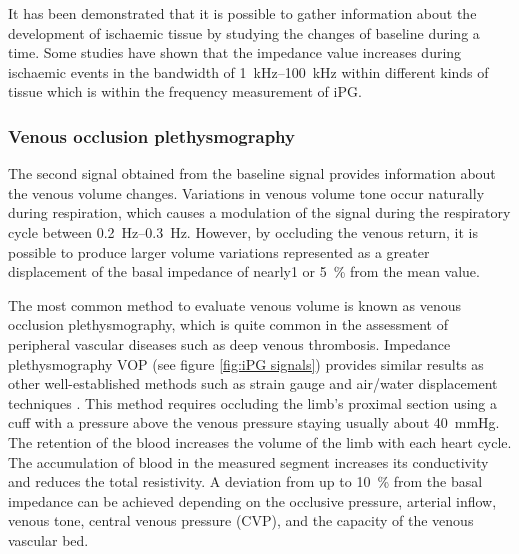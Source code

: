 It has been demonstrated that it is possible to gather information about the development of ischaemic tissue by studying the changes of baseline during a time. Some studies have shown that the impedance value increases during ischaemic events in the bandwidth of \SIrange{1}{100}{\kilo\hertz} within different kinds of tissue \cite{songer2001tissue,casas1999vivo,kun1994tissue,ristic1997muscle} which is within the frequency measurement of iPG. 

\subsubsection{Venous occlusion plethysmography}
The second signal obtained from the baseline signal provides information about the venous volume changes. Variations in venous volume tone occur naturally during respiration, which causes a modulation of the signal during the respiratory cycle between \SIrange{0.2}{0.3}{\hertz}. However, by occluding the venous return, it is possible to produce larger volume variations represented as a greater displacement of the basal impedance of nearly\SI{1}{\Omega} or \SI{5}{\percent} from the mean value. 

The most common method to evaluate venous volume is known as venous occlusion plethysmography, which is quite common in the assessment of peripheral vascular diseases such as deep venous thrombosis. Impedance plethysmography VOP (see figure \ref{fig:iPG signals}) provides similar results as other well-established methods such as strain gauge\cite{schraibman1975comparison} and air/water displacement techniques \cite{fleming1986comparison}. This method requires occluding the limb's proximal section using a cuff with a pressure above the venous pressure staying usually about \SI{40}{\mmHg}.  The retention of the blood increases the volume of the limb with each heart cycle. The accumulation of blood in the measured segment increases its conductivity and reduces the total resistivity.  A deviation from up to \SI{10}{\percent} from the basal impedance can be achieved depending on the occlusive pressure, arterial inflow, venous tone, central venous pressure (CVP), and the capacity of the venous vascular bed. 

